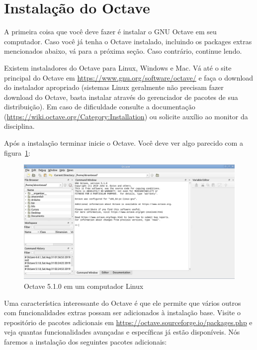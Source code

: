 \section{Instalação do Octave}
\label{sec:instal}

A primeira coisa que você deve fazer é instalar o GNU Octave em seu computador.
Caso você já tenha o Octave instalado, incluindo os packages extras mencionados
abaixo, vá para a próxima seção. Caso contrário, continue lendo.

Existem instaladores do Octave para Linux, Windows e Mac. Vá até o site principal
do Octave em \url{https://www.gnu.org/software/octave/} e faça o download do
instalador apropriado (sistemas Linux geralmente não precisam fazer download
do Octave, basta instalar através do gerenciador de pacotes de sua distribuição).
Em caso de dificuldade consulte a documentação
(\url{https://wiki.octave.org/Category:Installation}) ou solicite auxílio ao
monitor da disciplina.

Após a instalação terminar inicie o Octave. Você deve ver algo parecido com
a figura~\ref{fig:octave-gui}:

\begin{figure}[!h]
  \begin{center}
    \caption{Octave 5.1.0 em um computador Linux}
    \label{fig:octave-gui}
       \includegraphics[scale=0.3]{imagens/octave-gui.png}
  \end{center}
\end{figure}

Uma característica interessante do Octave é que ele permite que vários outros
 com funcionalidades extras possam ser adicionados à instalação
base. Visite o repositório de pacotes adicionais em
\url{https://octave.sourceforge.io/packages.php} e veja quantas funcionalidades
avançadas e específicas já estão disponíveis. Nós faremos a instalação dos
seguintes pacotes adicionais:

